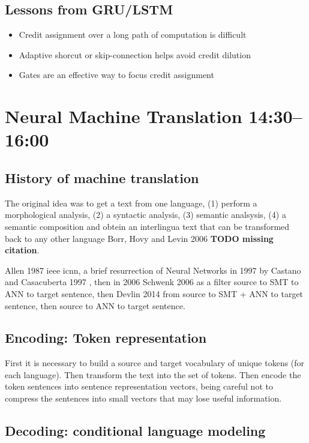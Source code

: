 \documentclass[b5paper]{report}
\begin{document}
\subsection{Lessons from GRU/LSTM}

\begin{itemize}
  \item Credit assignment over a long path of computation is difficult
    \item Adaptive shorcut or skip-connection helps avoid credit dilution
      \item Gates are an effective way to focus credit assignment
\end{itemize}

\section{Neural Machine Translation 14:30--16:00}

\subsection{History of machine translation}

The original idea was to get a text from one language, (1) perform a
morphological analysis, (2) a syntactic analysis, (3) semantic analsysis, (4) a
semantic composition and obtein an interlingua text that can be transformed
back to any other language Borr, Hovy and Levin 2006 \textbf{TODO missing
citation}.

Allen 1987 ieee icnn, a brief resurrection of Neural Networks in 1997 by
Castano and Casacuberta 1997 \cite{castano1997machine}, then in 2006 Schwenk
2006 \cite{schwenk2006continuous} as a filter source to SMT to ANN to target sentence, then Devlin 2014 from
source to SMT + ANN to target sentence, then source to ANN to target sentence.

\subsection{Encoding: Token representation}

First it is necessary to build a source and target vocabulary of unique tokens
(for each language). Then transform the text into the set of tokens. Then
encode the token sentences into sentence representation vectors, being careful
not to compress the sentences into small vectors that may lose useful
information.


\subsection{Decoding: conditional language modeling}
\end{document}
